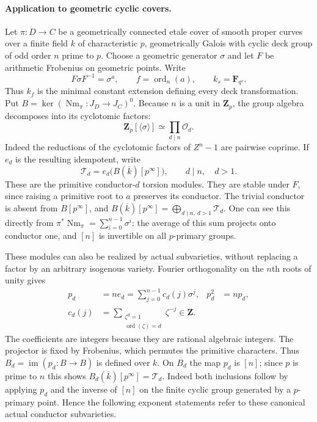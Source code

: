 \documentclass[11pt,a4paper]{article}
\providecommand{\mathscr}{\mathcal}
\begin{document}
\paragraph{Application to geometric cyclic covers.}
Let $\pi:D\to C$ be a geometrically connected etale cover of
smooth proper curves over a finite field $k$ of characteristic
$p$, geometrically Galois with cyclic deck group of odd order
$n$ prime to $p$.  Choose a geometric generator $\sigma$ and let $F$ be
arithmetic Frobenius on geometric points.  Write
\[
                 F\sigma F^{-1}=\sigma^a,
       \qquad f=\operatorname{ord}_n(a),\qquad k_s=\mathbf F_{q^s}.
 \tag{SD.7}
\]
Thus $k_f$ is the minimal constant extension defining every
deck transformation.  Put
$B=\ker(\operatorname{Nm}_\pi:J_D\to J_C)^0$.
Because $n$ is a unit in $\mathbf Z_p$, the group algebra
decomposes into its cyclotomic factors:
\[
 \mathbf Z_p[\langle\sigma\rangle]
       \simeq\prod_{d\mid n}\mathcal O_d.
 \tag{SD.8}
\]
Indeed the reductions of the cyclotomic factors of $Z^n-1$
are pairwise coprime.  If $e_d$ is the resulting idempotent,
write
\[
 \mathscr T_d=e_d\bigl(B(\overline k)[p^\infty]\bigr),
              \qquad d\mid n,\quad d>1.
 \tag{SD.9}
\]
These are the primitive conductor-$d$ torsion modules.  They
are stable under $F$, since raising a primitive root to $a$
preserves its conductor.  The trivial conductor is absent
from $B[p^\infty]$, and
$B(\overline k)[p^\infty]=\bigoplus_{d\mid n,\ d>1}\mathscr T_d$.
One can see this directly from
$\pi^*\operatorname{Nm}_\pi=\sum_{i=0}^{n-1}\sigma^i$:
the average of this sum projects onto conductor one, and
$[n]$ is invertible on all $p$-primary groups.

These modules can also be realized by actual subvarieties,
without replacing a factor by an arbitrary isogenous variety.
Fourier orthogonality on the $n$th roots of unity gives
\[
 \begin{aligned}
 p_d&=ne_d=\sum_{j=0}^{n-1}c_d(j)\sigma^j,
                       &p_d^2&=np_d,\\
 c_d(j)&=\sum_{\substack{\zeta^d=1\\\operatorname{ord}(\zeta)=d}}
                         \zeta^{-j}\in\mathbf Z.
 \end{aligned}
 \tag{SD.9a}
\]
The coefficients are integers because they are rational
algebraic integers.  The projector is fixed by Frobenius,
which permutes the primitive characters.  Thus
$B_d=\operatorname{im}(p_d:B\to B)$ is defined over $k$.
On $B_d$ the map $p_d$ is $[n]$; since $p$ is prime to $n$ this shows
$B_d(\overline k)[p^\infty]=\mathscr T_d$.
Indeed both inclusions follow by applying $p_d$ and the
inverse of $[n]$ on the finite cyclic group generated by a
$p$-primary point.  Hence the following exponent statements
refer to these canonical actual conductor subvarieties.
\end{document}
